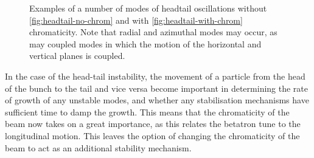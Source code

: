 \begin{figure}
\begin{center}
\end{center}
\caption{Examples of a number of modes of headtail oscillations without \ref{fig:headtail-no-chrom} and with \ref{fig:headtail-with-chrom} chromaticity. Note that radial and azimuthal modes may occur, as may coupled modes in which the motion of the horizontal and vertical planes is coupled.}
\label{fig:trans_oscillations}
\end{figure}


In the case of the head-tail instability, the movement of a particle from the head of the bunch to the tail and vice versa become important in determining the rate of growth of any unstable modes, and whether any stabilisation mechanisms have sufficient time to damp the growth. This means that the chromaticity of the beam now takes on a great importance, as this relates the betatron tune to the longitudinal motion. This leaves the option of changing the chromaticity of the beam to act as an additional stability mechanism.

